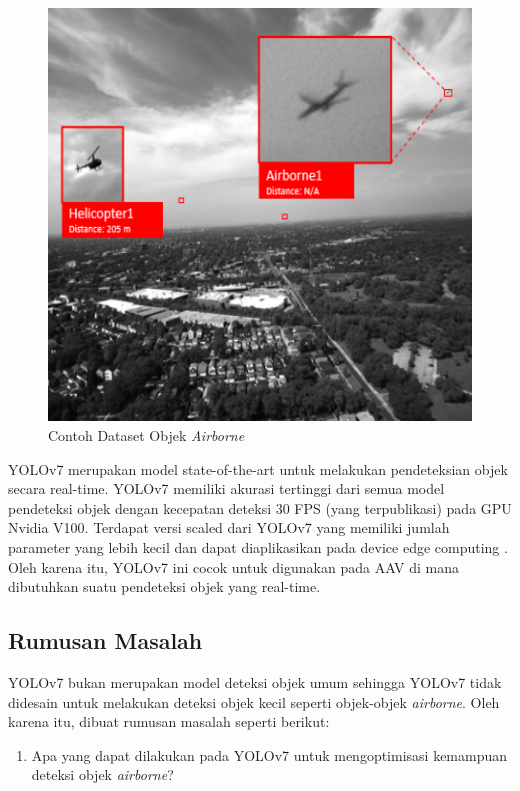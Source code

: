     \begin{figure} [ht]
        \centering
        \includegraphics[scale=0.5]{pictures/dataset-example-labeled.png}
        \caption{Contoh Dataset Objek \emph{Airborne}}
        \label{fig:airborne-object-example-1}
    \end{figure}

    YOLOv7 merupakan model state-of-the-art untuk melakukan pendeteksian objek secara real-time.
    YOLOv7 memiliki akurasi tertinggi dari semua model pendeteksi objek dengan kecepatan deteksi 30 FPS (yang terpublikasi) pada GPU Nvidia V100.
    Terdapat versi scaled dari YOLOv7 yang memiliki jumlah parameter yang lebih kecil dan dapat diaplikasikan pada device edge computing \parencite{yolov7}.
    Oleh karena itu, YOLOv7 ini cocok untuk digunakan pada AAV di mana dibutuhkan suatu pendeteksi objek yang real-time.

\subsection{Rumusan Masalah}
    YOLOv7 bukan merupakan model deteksi objek umum sehingga YOLOv7 tidak didesain untuk melakukan deteksi objek kecil seperti objek-objek \emph{airborne}.
    Oleh karena itu, dibuat rumusan masalah seperti berikut:
    \begin{enumerate}
        \item Apa yang dapat dilakukan pada YOLOv7 untuk mengoptimisasi kemampuan deteksi objek \emph{airborne}?
    \end{enumerate}

